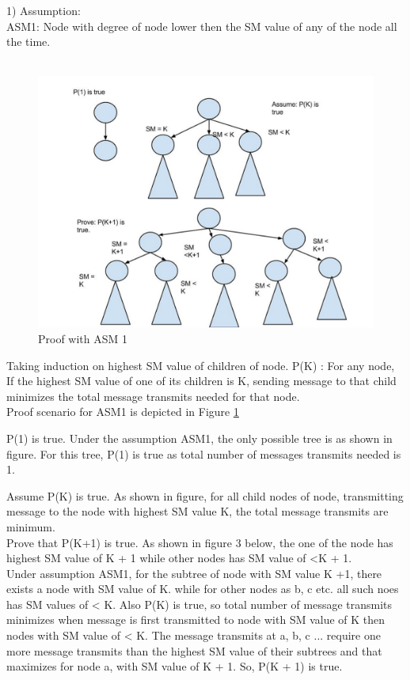 1) Assumption: \\ ASM1: Node with degree of node lower then the SM value of any of the node all the time.\\\ 

\begin{figure}[4c]
    \centering
    \includegraphics[scale=0.10]{4c}
    \caption{Proof with ASM 1}
    \label{fig:4c}
\end{figure}

Taking induction on highest SM value of children of node. 
P(K) : For any node, If the highest SM value of one of its children is K, sending message to that child minimizes the total message transmits needed for that node.\\ 

Proof scenario for ASM1 is depicted in Figure \ref{fig:4c}

P(1) is true. Under the assumption ASM1, the only possible tree is as shown in figure.
For this tree, P(1) is true as total number of messages transmits needed is 1. 

Assume P(K) is true.  As shown in figure, for all child nodes of node, transmitting message to the node with highest SM value K, the total message transmits are minimum.\\

Prove that P(K+1) is true. As shown in figure 3 below, the one of the node has highest SM value of K + 1 while other nodes has SM value of <K + 1. \\

Under assumption ASM1, for the subtree of node with SM value K +1, there exists a node with SM value of K. while for other nodes as b, c etc. all such noes has SM values of < K. Also P(K) is true, so total number of message transmits minimizes when message is first transmitted to node with SM value of K then nodes with SM value of < K. The message transmits at a, b, c ... require one more message transmits than the highest SM value of their subtrees and that maximizes for node a, with SM value of K + 1. So, P(K + 1) is true. \\

